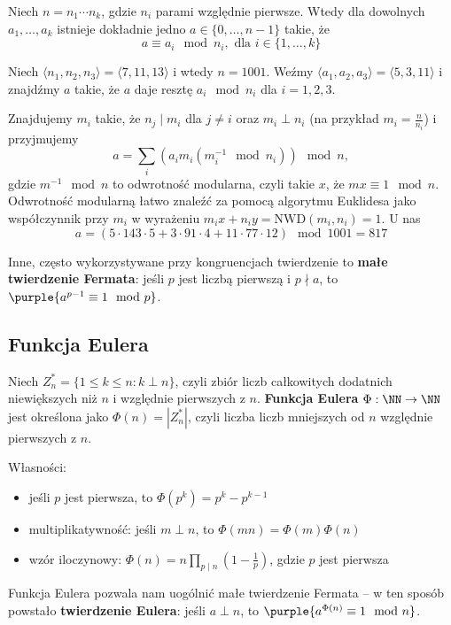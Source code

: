 Niech $n=n_1\cdots n_k$, gdzie $n_i$ parami względnie pierwsze. Wtedy dla dowolnych $a_1,\ldots,a_k$ istnieje dokładnie jedno $a\in\{0,\ldots,n-1\}$ takie, że
$$a \equiv a_i \mod{n_i}, \text{ dla } i\in\{1,\ldots,k\}$$

\begin{example}
    Niech $\langle n_1,n_2,n_3\rangle = \langle7,11,13\rangle$ i wtedy $n=1001$. Weźmy $\langle a_1,a_2,a_3\rangle = \langle5,3,11\rangle$ i znajdźmy $a$ takie, że $a$ daje resztę $a_i \mod{n_i}$ dla $i=1,2,3$.

    Znajdujemy $m_i$ takie, że $n_j\mid m_i$ dla $j\neq i$ oraz $m_i\perp n_i$ (na przykład $m_i=\frac{n}{n_i}$) i przyjmujemy
    $$a=\sum_i(a_im_i(m_i^{-1}\mod{n_i}))\mod{n},$$
    gdzie $m^{-1}\mod{n}$ to odwrotność modularna, czyli takie $x$, że $mx\equiv1\mod{n}$. Odwrotność modularną łatwo znaleźć za pomocą algorytmu Euklidesa jako współczynnik przy $m_i$ w wyrażeniu $m_ix+n_iy=\mathrm{NWD}(m_i,n_i)=1$. U nas
    $$a=(5\cdot143\cdot5+3\cdot91\cdot4+11\cdot77\cdot12)\mod{1001}=817$$
\end{example}

Inne, często wykorzystywane przy kongruencjach twierdzenie to \textbf{małe twierdzenie Fermata}: jeśli $p$ jest liczbą pierwszą i $p\nmid a$, to $\purple{a^{p-1}\equiv1\mod{p}}$.

\subsection{Funkcja Eulera}

Niech $Z_n^*=\{1\leq k\leq n : k\perp n\}$, czyli zbiór liczb całkowitych dodatnich niewiększych niż $n$ i względnie pierwszych z $n$. \textbf{Funkcja Eulera} $\Phi:\NN\to\NN$ jest określona jako $\Phi(n)=|Z_n^*|$, czyli liczba liczb mniejszych od $n$ względnie pierwszych z $n$.

Własności:
\begin{itemize}
    \item jeśli $p$ jest pierwsza, to $\Phi(p^k)=p^k-p^{k-1}$
    \item multiplikatywność: jeśli $m\perp n$, to $\Phi(mn)=\Phi(m)\Phi(n)$
    \item wzór iloczynowy: $\Phi(n)=n\prod_{p\mid n}(1-\frac{1}{p})$, gdzie $p$ jest pierwsza
\end{itemize}

Funkcja Eulera pozwala nam uogólnić małe twierdzenie Fermata -- w ten sposób powstało \textbf{twierdzenie Eulera}: jeśli $a\perp n$, to $\purple{a^{\Phi(n)}\equiv1\mod{n}}$.

